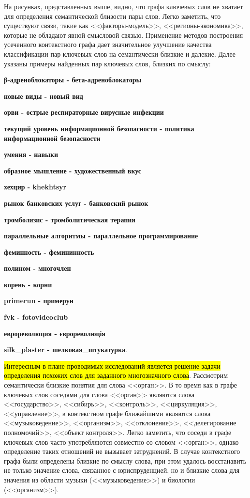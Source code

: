 На рисунках, представленных выше, видно, что графа ключевых слов не хватает для определения семантической близости пары слов. Легко заметить, что существуют связи, такие как <<факторы-модель>>, <<регионы-экономика>>, которые не обладают явной смысловой связью. Применение методов построения усеченного контекстного графа дает значительное улучшение качества классификации пар ключевых слов на семантически близкие и далекие. Далее указаны примеры найденных пар ключевых слов, близких по смыслу:

\textbf{β-адреноблокаторы   -   бета-адреноблокаторы}

\textbf{новые виды   -   новый вид}

\textbf{орви   -   острые респираторные вирусные инфекции}

\textbf{текущий уровень информационной безопасности   - политика информационной безопасности}

\textbf{умения   -   навыки}

\textbf{образное мышление   -   художественный вкус}

\textbf{хехцир   -   khekhtsyr}

\textbf{рынок банковских услуг   -   банковский рынок}

\textbf{тромболизис   -   тромболитическая терапия}

\textbf{параллельные алгоритмы   -   параллельное программирование}

\textbf{феминность   -   фемининность}

\textbf{полином  -  многочлен}

\textbf{корень  -   корни}

\textbf{primerun  -  примерун}

\textbf{fvk  -  fotovideoclub}

\textbf{еврореволюция  -   єврореволюція}

\textbf{silk\_plaster    -  шелковая\_штукатурка}.

\hl{Интересным в плане проводимых исследований является решение задачи определения похожих слов для заданного многозначного слова}. Рассмотрим семантически близкие понятия для слова <<орган>>.  В то время как в графе ключевых слов соседями для слова <<орган>> являются слова <<государство>>, <<сибирь>>, <<контроль>>, <<циркуляция>>, <<управление>>, в контекстном графе ближайшими являются слова <<музыковедение>>, <<организм>>, <<отклонение>>, <<делегирование полномочий>>, <<объект контроля>>. Легко заметить, что соседи в графе ключевых слов часто употребляются совместно со словом <<орган>>, однако определение таких отношений не вызывает затруднений. В случае контекстного графа были определены близкие по смыслу слова, при этом удалось восстанавить не только значение слова, связанное с юриспруденцией, но и близкие слова для значения из области музыки (<<музыковедение>>) и биологии (<<организм>>).


